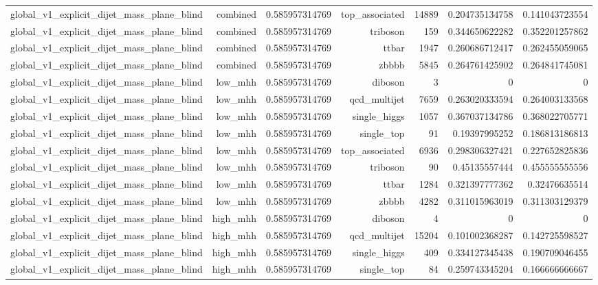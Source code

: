 \begin{table}[htbp]
{\begin{tabular}{lrrrrrr}
global\_v1\_explicit\_dijet\_mass\_plane\_blind & combined & 0.585957314769 & top\_associated & 14889 & 0.204735134758 & 0.141043723554 \\
global\_v1\_explicit\_dijet\_mass\_plane\_blind & combined & 0.585957314769 & triboson & 159 & 0.344650622282 & 0.352201257862 \\
global\_v1\_explicit\_dijet\_mass\_plane\_blind & combined & 0.585957314769 & ttbar & 1947 & 0.260686712417 & 0.262455059065 \\
global\_v1\_explicit\_dijet\_mass\_plane\_blind & combined & 0.585957314769 & zbbbb & 5845 & 0.264761425902 & 0.264841745081 \\
global\_v1\_explicit\_dijet\_mass\_plane\_blind & low\_mhh & 0.585957314769 & diboson & 3 & 0 & 0 \\
global\_v1\_explicit\_dijet\_mass\_plane\_blind & low\_mhh & 0.585957314769 & qcd\_multijet & 7659 & 0.263020333594 & 0.264003133568 \\
global\_v1\_explicit\_dijet\_mass\_plane\_blind & low\_mhh & 0.585957314769 & single\_higgs & 1057 & 0.367037134786 & 0.368022705771 \\
global\_v1\_explicit\_dijet\_mass\_plane\_blind & low\_mhh & 0.585957314769 & single\_top & 91 & 0.19397995252 & 0.186813186813 \\
global\_v1\_explicit\_dijet\_mass\_plane\_blind & low\_mhh & 0.585957314769 & top\_associated & 6936 & 0.298306327421 & 0.227652825836 \\
global\_v1\_explicit\_dijet\_mass\_plane\_blind & low\_mhh & 0.585957314769 & triboson & 90 & 0.45135557444 & 0.455555555556 \\
global\_v1\_explicit\_dijet\_mass\_plane\_blind & low\_mhh & 0.585957314769 & ttbar & 1284 & 0.321397777362 & 0.32476635514 \\
global\_v1\_explicit\_dijet\_mass\_plane\_blind & low\_mhh & 0.585957314769 & zbbbb & 4282 & 0.311015963019 & 0.311303129379 \\
global\_v1\_explicit\_dijet\_mass\_plane\_blind & high\_mhh & 0.585957314769 & diboson & 4 & 0 & 0 \\
global\_v1\_explicit\_dijet\_mass\_plane\_blind & high\_mhh & 0.585957314769 & qcd\_multijet & 15204 & 0.101002368287 & 0.142725598527 \\
global\_v1\_explicit\_dijet\_mass\_plane\_blind & high\_mhh & 0.585957314769 & single\_higgs & 409 & 0.334127345438 & 0.190709046455 \\
global\_v1\_explicit\_dijet\_mass\_plane\_blind & high\_mhh & 0.585957314769 & single\_top & 84 & 0.259743345204 & 0.166666666667 \\

\end{tabular}}
\end{table}
